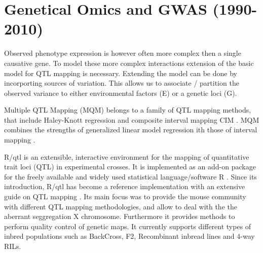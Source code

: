 \section{Genetical Omics and GWAS (1990-2010)}

Observed phenotype expression is however often more complex then a single causative gene. 
To model these more complex interactions extension of the basic model for QTL mapping is 
necessary. Extending the model can be done by incorporting sources of variation. This allows 
us to associate / partition the observed variance to either environmental factors (E) or a 
genetic loci (G).

Multiple QTL Mapping (MQM) belongs to a family of QTL mapping methods, that include Haley-Knott 
regression \cite{Haley:1992} and composite interval mapping CIM \cite{Zeng:1994}. MQM combines 
the strengths of generalized linear model regression ith those of interval mapping 
\cite{Jansen:1993, Jansen:1994b}. 

R/qtl is an extensible, interactive environment for the mapping of quantitative trait loci (QTL) 
in experimental crosses. It is implemented as an add-on package for the freely available and 
widely used statistical language/software R \cite{R:2009}. Since its introduction, R/qtl 
\cite{Broman:2003} has become a reference implementation with an extensive guide on QTL mapping 
\cite{RQTLGuide:2009}. Its main focus was to provide the mouse community with different QTL 
mapping methodologies, and allow to deal with the the aberrant seggregation X chromosome. 
Furthermore it provides methods to perform quality control of genetic maps. It currently 
supports different types of inbred populations such as BackCross, F2, Recombinant inbread 
lines and 4-way RILs. \cite{Broman:2003}

